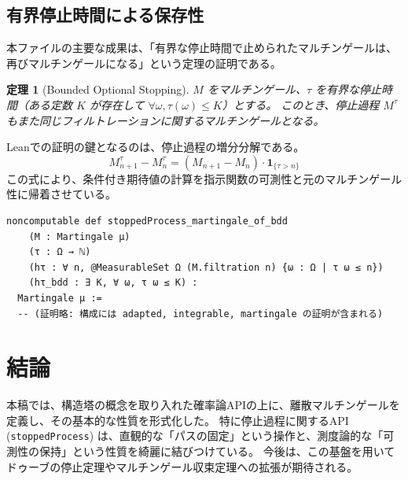 \documentclass[a4paper,11pt]{article}
\theoremstyle{definition}
\theoremstyle{plain}
\newtheorem{theorem}[definition]{定理}
\begin{document}
\subsection{有界停止時間による保存性}
本ファイルの主要な成果は、「有界な停止時間で止められたマルチンゲールは、再びマルチンゲールになる」という定理の証明である。

\begin{theorem}[Bounded Optional Stopping]
$M$ をマルチンゲール、$\tau$ を有界な停止時間（ある定数 $K$ が存在して $\forall \omega, \tau(\omega) \le K$）とする。
このとき、停止過程 $M^\tau$ もまた同じフィルトレーションに関するマルチンゲールとなる。
\end{theorem}

Leanでの証明の鍵となるのは、停止過程の増分分解である。
\[ M^\tau_{n+1} - M^\tau_n = (M_{n+1} - M_n) \cdot \mathbf{1}_{\{\tau > n\}} \]
この式により、条件付き期待値の計算を指示関数の可測性と元のマルチンゲール性に帰着させている。

\begin{lstlisting}[caption=停止マルチンゲール定理の実装]
noncomputable def stoppedProcess_martingale_of_bdd
    (M : Martingale μ)
    (τ : Ω → ℕ)
    (hτ : ∀ n, @MeasurableSet Ω (M.filtration n) {ω : Ω | τ ω ≤ n})
    (hτ_bdd : ∃ K, ∀ ω, τ ω ≤ K) :
  Martingale μ :=
  -- (証明略: 構成には adapted, integrable, martingale の証明が含まれる)
\end{lstlisting}

\section{結論}
本稿では、構造塔の概念を取り入れた確率論APIの上に、離散マルチンゲールを定義し、その基本的な性質を形式化した。
特に停止過程に関するAPI (\texttt{stoppedProcess}) は、直観的な「パスの固定」という操作と、測度論的な「可測性の保持」という性質を綺麗に結びつけている。
今後は、この基盤を用いてドゥーブの停止定理やマルチンゲール収束定理への拡張が期待される。
\end{document}
